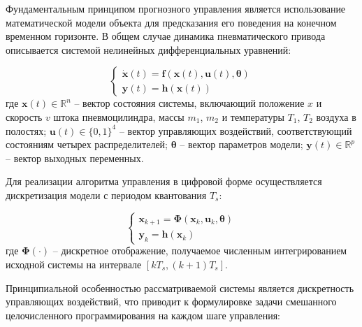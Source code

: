 Фундаментальным принципом прогнозного управления является использование математической модели
объекта для предсказания его поведения на конечном временном горизонте. В общем случае
динамика пневматического привода описывается системой нелинейных дифференциальных уравнений:

\begin{equation}
	\begin{cases}
		\dot{\mathbf{x}}(t) = \mathbf{f}(\mathbf{x}(t), \mathbf{u}(t), \boldsymbol{\theta}) \\
		\mathbf{y}(t) = \mathbf{h}(\mathbf{x}(t))
	\end{cases}
\end{equation}
где $\mathbf{x}(t) \in \mathbb{R}^n$ -- вектор состояния системы, включающий положение $x$ и скорость $v$ штока пневмоцилиндра, массы $m_1$, $m_2$ и температуры $T_1$, $T_2$ воздуха в полостях;
$\mathbf{u}(t) \in \{0,1\}^4$ -- вектор управляющих воздействий, соответствующий состояниям четырех распределителей;
$\boldsymbol{\theta}$ -- вектор параметров модели;
$\mathbf{y}(t) \in \mathbb{R}^p$ -- вектор выходных переменных.

Для реализации алгоритма управления в цифровой форме осуществляется дискретизация модели с периодом квантования $T_s$:

\begin{equation}
	\begin{cases}
		\mathbf{x}_{k+1} = \boldsymbol{\Phi}(\mathbf{x}_k, \mathbf{u}_k, \boldsymbol{\theta}) \\
		\mathbf{y}_k = \mathbf{h}(\mathbf{x}_k)
	\end{cases}
\end{equation}
где $\boldsymbol{\Phi}(\cdot)$ -- дискретное отображение, получаемое численным интегрированием исходной системы на интервале $[kT_s, (k+1)T_s]$.

Принципиальной особенностью рассматриваемой системы является дискретность управляющих воздействий,
что приводит к формулировке задачи смешанного целочисленного программирования на каждом шаге управления:

